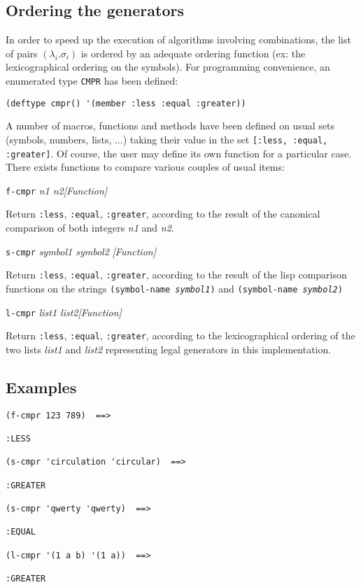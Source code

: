 \subsection {Ordering the generators}

In order to speed up the execution of algorithms involving combinations,
the list of pairs $(\lambda_i.\sigma_i)$ is ordered by an adequate ordering function (ex: the  lexicographical ordering
on the symbols). For programming convenience, an enumerated type {\tt CMPR} has been defined:
{\footnotesize\begin{verbatim}
(deftype cmpr() '(member :less :equal :greater))
\end{verbatim}}
A number of macros, functions and methods have been defined
on usual sets (symbols, numbers, lists, ...) taking their value in the set
{\tt [:less, :equal, :greater]}. Of course, the user may define its own function for a particular case.
There exists functions to compare various couples of usual items:
\vskip 0.45cm
{\parindent=0mm
{\leftskip=5mm 
{\tt f-cmpr} {\em n1 n2}\hfill {\em [Function]} \par}
{\leftskip=12mm 
Return {\tt :less}, {\tt :equal}, {\tt :greater}, according to the result of
the canonical comparison of both integers {\em n1} and {\em n2}. \par}
{\leftskip=5mm 
{\tt s-cmpr} {\em symbol1 symbol2} \hfill {\em [Function]}\par}
{\leftskip=12mm 
Return  {\tt :less}, {\tt :equal}, {\tt :greater}, according to the result of
the lisp comparison functions on the strings {\tt (symbol-name {\em symbol1})}
and {\tt (symbol-name {\em symbol2})} \par}
{\leftskip=5mm 
{\tt l-cmpr} {\em list1 list2}\hfill {\em [Function]} \par}
{\leftskip=12mm 
Return  {\tt :less}, {\tt :equal}, {\tt :greater}, according to the 
lexicographical ordering of the two lists  {\em list1}
and {\em list2} representing legal generators in this implementation. \par}
}

\subsection* {Examples}

{\footnotesize\begin{verbatim}
(f-cmpr 123 789)  ==>

:LESS

(s-cmpr 'circulation 'circular)  ==>

:GREATER

(s-cmpr 'qwerty 'qwerty)  ==>

:EQUAL

(l-cmpr '(1 a b) '(1 a))  ==>

:GREATER
\end{verbatim}}
\newpage

